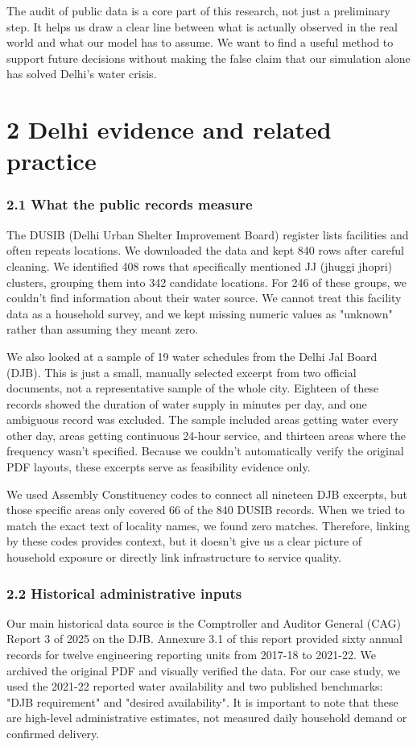 \documentclass[conference]{IEEEtran}
\begin{document}
The audit of public data is a core part of this research, not just a preliminary step. It helps us draw a clear line between what is actually observed in the real world and what our model has to assume. We want to find a useful method to support future decisions without making the false claim that our simulation alone has solved Delhi's water crisis.

\section{2 Delhi evidence and related practice}
\subsubsection{2.1 What the public records measure}
The DUSIB (Delhi Urban Shelter Improvement Board) register lists facilities and often repeats locations. We downloaded the data and kept 840 rows after careful cleaning. We identified 408 rows that specifically mentioned JJ (jhuggi jhopri) clusters, grouping them into 342 candidate locations. For 246 of these groups, we couldn't find information about their water source. We cannot treat this facility data as a household survey, and we kept missing numeric values as "unknown" rather than assuming they meant zero.

We also looked at a sample of 19 water schedules from the Delhi Jal Board (DJB). This is just a small, manually selected excerpt from two official documents, not a representative sample of the whole city. Eighteen of these records showed the duration of water supply in minutes per day, and one ambiguous record was excluded. The sample included areas getting water every other day, areas getting continuous 24-hour service, and thirteen areas where the frequency wasn't specified. Because we couldn't automatically verify the original PDF layouts, these excerpts serve as feasibility evidence only.

We used Assembly Constituency codes to connect all nineteen DJB excerpts, but those specific areas only covered 66 of the 840 DUSIB records. When we tried to match the exact text of locality names, we found zero matches. Therefore, linking by these codes provides context, but it doesn't give us a clear picture of household exposure or directly link infrastructure to service quality.

\subsubsection{2.2 Historical administrative inputs}
Our main historical data source is the Comptroller and Auditor General (CAG) Report 3 of 2025 on the DJB. Annexure 3.1 of this report provided sixty annual records for twelve engineering reporting units from 2017-18 to 2021-22. We archived the original PDF and visually verified the data. For our case study, we used the 2021-22 reported water availability and two published benchmarks: "DJB requirement" and "desired availability". It is important to note that these are high-level administrative estimates, not measured daily household demand or confirmed delivery.
\end{document}
